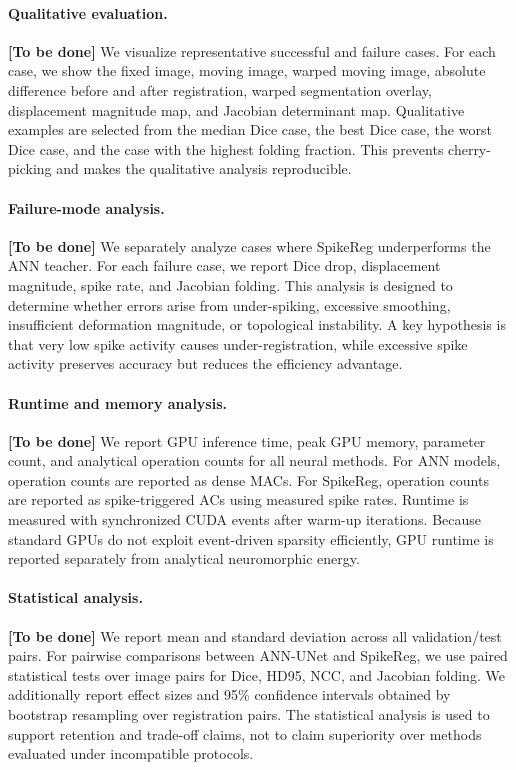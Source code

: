 \paragraph{Qualitative evaluation.}
\textbf{[To be done]} We visualize representative successful and failure cases. For each case, we show the fixed image, moving image, warped moving image, absolute difference before and after registration, warped segmentation overlay, displacement magnitude map, and Jacobian determinant map. Qualitative examples are selected from the median Dice case, the best Dice case, the worst Dice case, and the case with the highest folding fraction. This prevents cherry-picking and makes the qualitative analysis reproducible.

\paragraph{Failure-mode analysis.}
\textbf{[To be done]} We separately analyze cases where SpikeReg underperforms the ANN teacher. For each failure case, we report Dice drop, displacement magnitude, spike rate, and Jacobian folding. This analysis is designed to determine whether errors arise from under-spiking, excessive smoothing, insufficient deformation magnitude, or topological instability. A key hypothesis is that very low spike activity causes under-registration, while excessive spike activity preserves accuracy but reduces the efficiency advantage.

\paragraph{Runtime and memory analysis.}
\textbf{[To be done]} We report GPU inference time, peak GPU memory, parameter count, and analytical operation counts for all neural methods. For ANN models, operation counts are reported as dense MACs. For SpikeReg, operation counts are reported as spike-triggered ACs using measured spike rates. Runtime is measured with synchronized CUDA events after warm-up iterations. Because standard GPUs do not exploit event-driven sparsity efficiently, GPU runtime is reported separately from analytical neuromorphic energy.

\paragraph{Statistical analysis.}
\textbf{[To be done]} We report mean and standard deviation across all validation/test pairs. For pairwise comparisons between ANN-UNet and SpikeReg, we use paired statistical tests over image pairs for Dice, HD95, NCC, and Jacobian folding. We additionally report effect sizes and 95\% confidence intervals obtained by bootstrap resampling over registration pairs. The statistical analysis is used to support retention and trade-off claims, not to claim superiority over methods evaluated under incompatible protocols.

